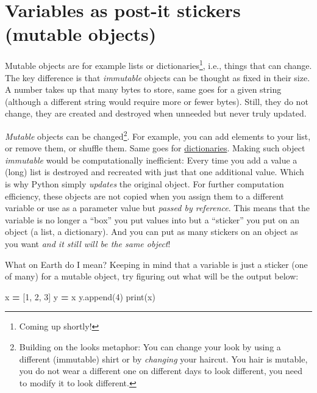 \documentclass[
]{book}
\newenvironment{Shaded}{\begin{snugshade}}{\end{snugshade}}
\newcommand{\BuiltInTok}[1]{#1}
\newcommand{\DecValTok}[1]{\textcolor[rgb]{0.00,0.00,0.81}{#1}}
\newcommand{\NormalTok}[1]{#1}
\newcommand{\OperatorTok}[1]{\textcolor[rgb]{0.81,0.36,0.00}{\textbf{#1}}}
\begin{document}
\hypertarget{mutable-objects}{%
\section{Variables as post-it stickers (mutable objects)}\label{mutable-objects}}

Mutable objects are for example lists or dictionaries\footnote{Coming up shortly!}, i.e., things that can change. The key difference is that \emph{immutable} objects can be thought as fixed in their size. A number takes up that many bytes to store, same goes for a given string (although a different string would require more or fewer bytes). Still, they do not change, they are created and destroyed when unneeded but never truly updated.

\emph{Mutable} objects can be changed\footnote{Building on the looks metaphor: You can change your look by using a different (immutable) shirt or by \emph{changing} your haircut. You hair is mutable, you do not wear a different one on different days to look different, you need to modify it to look different.}. For example, you can add elements to your list, or remove them, or shuffle them. Same goes for \href{https://docs.python.org/3/tutorial/datastructures.html?highlight=dictionary\#dictionaries}{dictionaries}. Making such object \emph{immutable} would be computationally inefficient: Every time you add a value a (long) list is destroyed and recreated with just that one additional value. Which is why Python simply \emph{updates} the original object. For further computation efficiency, these objects are not copied when you assign them to a different variable or use as a parameter value but \emph{passed by reference}. This means that the variable is no longer a ``box'' you put values into but a ``sticker'' you put on an object (a list, a dictionary). And you can put as many stickers on an object as you want \emph{and it still will be the same object}!

What on Earth do I mean? Keeping in mind that a variable is just a sticker (one of many) for a mutable object, try figuring out what will be the output below:

\begin{Shaded}
\begin{Highlighting}[]
\NormalTok{x }\OperatorTok{=}\NormalTok{ [}\DecValTok{1}\NormalTok{, }\DecValTok{2}\NormalTok{, }\DecValTok{3}\NormalTok{]}
\NormalTok{y }\OperatorTok{=}\NormalTok{ x}
\NormalTok{y.append(}\DecValTok{4}\NormalTok{)}
\BuiltInTok{print}\NormalTok{(x)}
\end{Highlighting}
\end{Shaded}
\end{document}
